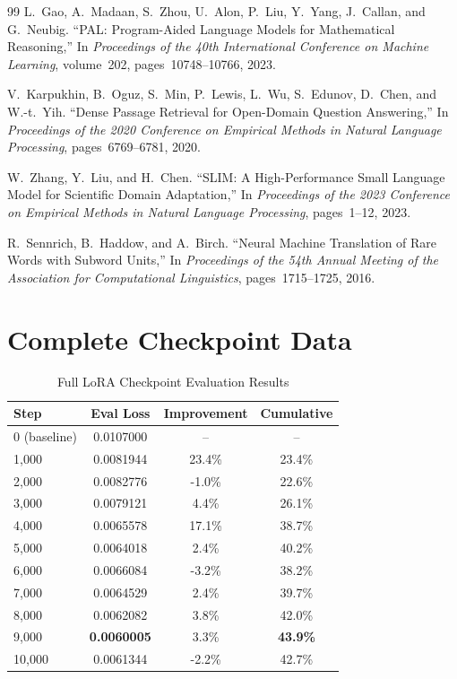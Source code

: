 \documentclass[11pt,a4paper,twocolumn]{article}
\theoremstyle{plain}
\theoremstyle{definition}
\begin{document}
\begin{thebibliography}{99}
L.~Gao, A.~Madaan, S.~Zhou, U.~Alon, P.~Liu, Y.~Yang, J.~Callan, 
\newblock and G.~Neubig.
\newblock ``PAL: Program-Aided Language Models for Mathematical Reasoning,''
\newblock In \textit{Proceedings of the 40th International Conference 
\newblock on Machine Learning}, volume~202, pages~10748--10766, 2023.

V.~Karpukhin, B.~Oguz, S.~Min, P.~Lewis, L.~Wu, S.~Edunov, D.~Chen, 
\newblock and W.-t.~Yih.
\newblock ``Dense Passage Retrieval for Open-Domain Question Answering,''
\newblock In \textit{Proceedings of the 2020 Conference on Empirical Methods 
\newblock in Natural Language Processing}, pages~6769--6781, 2020.

W.~Zhang, Y.~Liu, and H.~Chen.
\newblock ``SLIM: A High-Performance Small Language Model for Scientific 
\newblock Domain Adaptation,''
\newblock In \textit{Proceedings of the 2023 Conference on Empirical Methods 
\newblock in Natural Language Processing}, pages~1--12, 2023.

R.~Sennrich, B.~Haddow, and A.~Birch.
\newblock ``Neural Machine Translation of Rare Words with Subword Units,''
\newblock In \textit{Proceedings of the 54th Annual Meeting of the Association 
\newblock for Computational Linguistics}, pages~1715--1725, 2016.

\end{thebibliography}

\appendix
\section{Complete Checkpoint Data}

\begin{table}[H]
\centering
\caption{Full LoRA Checkpoint Evaluation Results}
\begin{tabular}{lccc}
\toprule
\textbf{Step} & \textbf{Eval Loss} & \textbf{Improvement} & \textbf{Cumulative} \\
\midrule
0 (baseline) & 0.0107000 & -- & -- \\
1,000 & 0.0081944 & 23.4\% & 23.4\% \\
2,000 & 0.0082776 & -1.0\% & 22.6\% \\
3,000 & 0.0079121 & 4.4\% & 26.1\% \\
4,000 & 0.0065578 & 17.1\% & 38.7\% \\
5,000 & 0.0064018 & 2.4\% & 40.2\% \\
6,000 & 0.0066084 & -3.2\% & 38.2\% \\
7,000 & 0.0064529 & 2.4\% & 39.7\% \\
8,000 & 0.0062082 & 3.8\% & 42.0\% \\
9,000 & \textbf{0.0060005} & 3.3\% & \textbf{43.9\%} \\
10,000 & 0.0061344 & -2.2\% & 42.7\% \\
\bottomrule
\end{tabular}
\end{table}
\end{document}
